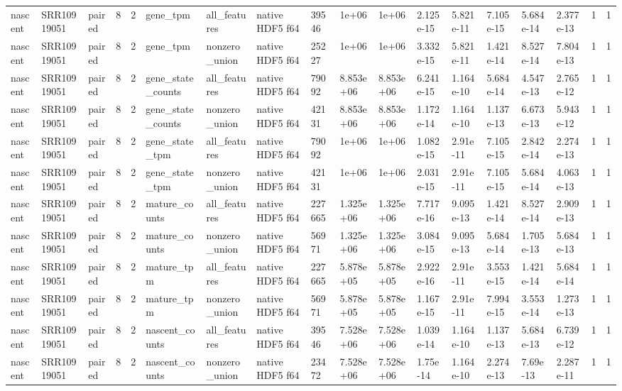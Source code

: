 \begin{tabular}{llllllllllllllllll}
nascent & SRR10919051 & paired & 8 & 2 & gene\_tpm & all\_features & native HDF5 f64 & 39546 & 1e+06 & 1e+06 & 2.125e-15 & 5.821e-11 & 7.105e-15 & 5.684e-14 & 2.377e-13 & 1 & 1 \\
nascent & SRR10919051 & paired & 8 & 2 & gene\_tpm & nonzero\_union & native HDF5 f64 & 25227 & 1e+06 & 1e+06 & 3.332e-15 & 5.821e-11 & 1.421e-14 & 8.527e-14 & 7.804e-13 & 1 & 1 \\
nascent & SRR10919051 & paired & 8 & 2 & gene\_state\_counts & all\_features & native HDF5 f64 & 79092 & 8.853e+06 & 8.853e+06 & 6.241e-15 & 1.164e-10 & 5.684e-14 & 4.547e-13 & 2.765e-12 & 1 & 1 \\
nascent & SRR10919051 & paired & 8 & 2 & gene\_state\_counts & nonzero\_union & native HDF5 f64 & 42131 & 8.853e+06 & 8.853e+06 & 1.172e-14 & 1.164e-10 & 1.137e-13 & 6.673e-13 & 5.943e-12 & 1 & 1 \\
nascent & SRR10919051 & paired & 8 & 2 & gene\_state\_tpm & all\_features & native HDF5 f64 & 79092 & 1e+06 & 1e+06 & 1.082e-15 & 2.91e-11 & 7.105e-15 & 2.842e-14 & 2.274e-13 & 1 & 1 \\
nascent & SRR10919051 & paired & 8 & 2 & gene\_state\_tpm & nonzero\_union & native HDF5 f64 & 42131 & 1e+06 & 1e+06 & 2.031e-15 & 2.91e-11 & 7.105e-15 & 5.684e-14 & 4.063e-13 & 1 & 1 \\
nascent & SRR10919051 & paired & 8 & 2 & mature\_counts & all\_features & native HDF5 f64 & 227665 & 1.325e+06 & 1.325e+06 & 7.717e-16 & 9.095e-13 & 1.421e-14 & 8.527e-14 & 2.909e-13 & 1 & 1 \\
nascent & SRR10919051 & paired & 8 & 2 & mature\_counts & nonzero\_union & native HDF5 f64 & 56971 & 1.325e+06 & 1.325e+06 & 3.084e-15 & 9.095e-13 & 5.684e-14 & 1.705e-13 & 5.684e-13 & 1 & 1 \\
nascent & SRR10919051 & paired & 8 & 2 & mature\_tpm & all\_features & native HDF5 f64 & 227665 & 5.878e+05 & 5.878e+05 & 2.922e-16 & 2.91e-11 & 3.553e-15 & 1.421e-14 & 5.684e-14 & 1 & 1 \\
nascent & SRR10919051 & paired & 8 & 2 & mature\_tpm & nonzero\_union & native HDF5 f64 & 56971 & 5.878e+05 & 5.878e+05 & 1.167e-15 & 2.91e-11 & 7.994e-15 & 3.553e-14 & 1.273e-13 & 1 & 1 \\
nascent & SRR10919051 & paired & 8 & 2 & nascent\_counts & all\_features & native HDF5 f64 & 39546 & 7.528e+06 & 7.528e+06 & 1.039e-14 & 1.164e-10 & 1.137e-13 & 5.684e-13 & 6.739e-12 & 1 & 1 \\
nascent & SRR10919051 & paired & 8 & 2 & nascent\_counts & nonzero\_union & native HDF5 f64 & 23472 & 7.528e+06 & 7.528e+06 & 1.75e-14 & 1.164e-10 & 2.274e-13 & 7.69e-13 & 2.287e-11 & 1 & 1 \\

\end{tabular}
